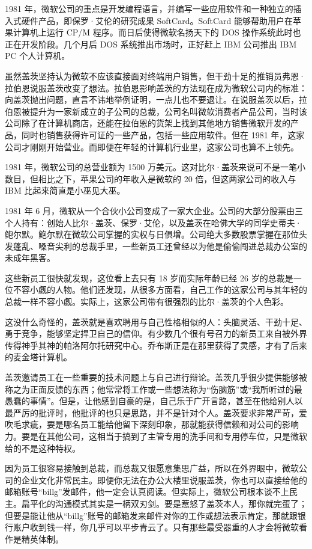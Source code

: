 \documentclass[12pt,UTF8]{ctexbook}
\begin{document}
1981 年，微软公司的重点是开发编程语言，并编写一些应用软件和一种独立的插入式硬件产品，即保罗·艾伦的研究成果 SoftCard。SoftCard 能够帮助用户在苹果计算机上运行 CP/M 程序。而日后使得微软名扬天下的 DOS 操作系统此时也正在开发阶段。几个月后 DOS 系统推出市场时，正好赶上 IBM 公司推出 IBM PC 个人计算机。

虽然盖茨坚持认为微软不应该直接面对终端用户销售，但干劲十足的推销员弗恩·拉伯恩说服盖茨改变了想法。拉伯恩影响盖茨的方法现在成为微软公司内的标准：向盖茨抛出问题，直言不讳地举例证明，一点儿也不要退让。在说服盖茨以后，拉伯恩被提升为一家新成立的子公司的总裁，公司名叫微软消费者产品公司，当时该公司除了在计算机商店，还能在拉伯恩的货架上找到其他地方销售微软开发的产品，同时也销售获得许可证的一些产品，包括一些应用软件。但在 1981 年，这家公司才刚刚开始营业。而即便在年轻的计算机行业里，这家公司也算不上领先。

1981 年，微软公司的总营业额为 1500 万美元。这对比尔·盖茨来说可不是一笔小数目，但相比之下，苹果公司的年收入是微软的 20 倍，但这两家公司的收入与 IBM 比起来简直是小巫见大巫。

1981 年 6 月，微软从一个合伙小公司变成了一家大企业。公司的大部分股票由三个人持有：创始人比尔·盖茨、保罗·艾伦，以及盖茨在哈佛大学的同学史蒂夫·鲍尔默。鲍尔默在微软公司掌握的实权与日俱增。公司绝大多数股票掌握在那位头发蓬乱、嗓音尖利的总裁手里，一些新员工还曾经以为他是偷偷闯进总裁办公室的未成年黑客。

这些新员工很快就发现，这位看上去只有 18 岁而实际年龄已经 26 岁的总裁是一位不容小觑的人物。他们还发现，从很多方面看，自己工作的这家公司与其年轻的总裁一样不容小觑。实际上，这家公司带有很强烈的比尔·盖茨的个人色彩。

这没什么奇怪的，盖茨就是喜欢聘用与自己性格相似的人：头脑灵活、干劲十足、勇于竞争，能够坚定捍卫自己的信仰。有少数几个很有号召力的新员工来自被外界传得神乎其神的帕洛阿尔托研究中心。乔布斯正是在那里获得了灵感，才有了后来的麦金塔计算机。

盖茨邀请员工在一些重要的技术问题上与自己进行辩论。盖茨几乎很少提供能够被称之为正面反馈的东西；他常常将工作或一些想法称为“伤脑筋”或“我所听过的最愚蠢的事情”。但是，让他感到自豪的是，自己乐于广开言路，甚至在他给别人以最严厉的批评时，他批评的也只是思路，并不是针对个人。盖茨要求非常严苛，爱吹毛求疵，要是哪名员工能给他留下深刻印象，那就能获得信赖和对公司的影响力。要是在其他公司，这相当于搞到了主管专用的洗手间和专用停车位，只是微软给的不是这种特权。

因为员工很容易接触到总裁，而总裁又很愿意集思广益，所以在外界眼中，微软公司的企业文化非常民主。即便你无法在办公大楼里说服盖茨，你也可以直接给他的邮箱账号“billg”发邮件，他一定会认真阅读。但实际上，微软公司根本谈不上民主。扁平化的沟通模式其实是一柄双刃剑。要是惹怒了盖茨本人，那你就完蛋了；但要是能让他从“billg”账号的邮箱发来邮件对你的工作或想法表示肯定，那就跟银行账户收到钱一样，你几乎可以平步青云了。只有那些最受器重的人才会将微软看作是精英体制。
\end{document}

